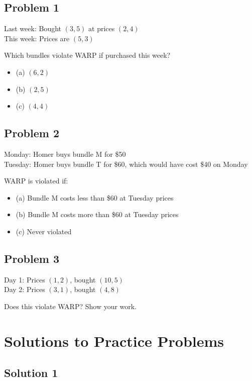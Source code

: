 \documentclass[11pt]{article}
\begin{document}
\subsection{Problem 1}

Last week: Bought $(3, 5)$ at prices $(2, 4)$\\
This week: Prices are $(5, 3)$

Which bundles violate WARP if purchased this week?
\begin{itemize}
\item (a) $(6, 2)$
\item (b) $(2, 5)$
\item (c) $(4, 4)$
\end{itemize}

\subsection{Problem 2}

Monday: Homer buys bundle M for \$50\\
Tuesday: Homer buys bundle T for \$60, which would have cost \$40 on Monday

WARP is violated if:
\begin{itemize}
\item (a) Bundle M costs less than \$60 at Tuesday prices
\item (b) Bundle M costs more than \$60 at Tuesday prices
\item (c) Never violated
\end{itemize}

\subsection{Problem 3}

Day 1: Prices $(1, 2)$, bought $(10, 5)$\\
Day 2: Prices $(3, 1)$, bought $(4, 8)$

Does this violate WARP? Show your work.

\newpage

\section{Solutions to Practice Problems}

\subsection{Solution 1}
\end{document}
